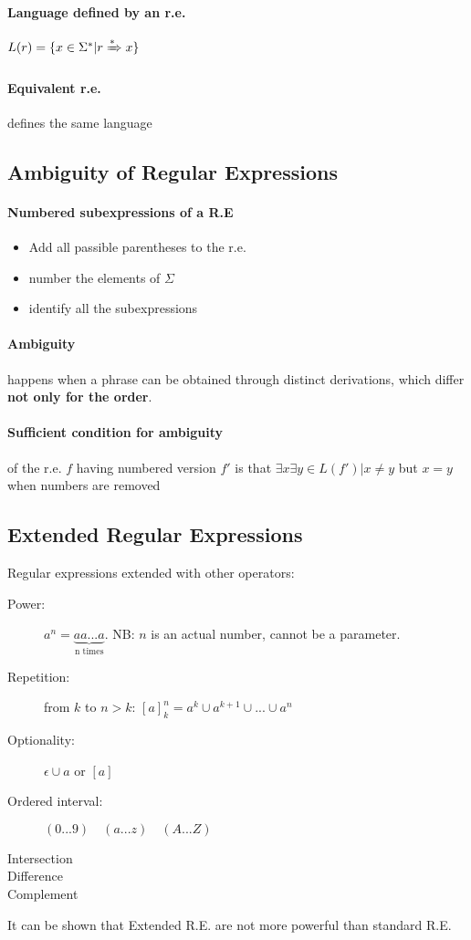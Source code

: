 \documentclass{article}
\begin{document}
\paragraph{Language defined by an r.e.} $L(r)=\{x\in \Sigma^* | r \xRightarrow{*} x\}$
\paragraph{Equivalent r.e.} defines the same language


\subsection{Ambiguity of Regular Expressions}
\paragraph{Numbered subexpressions of a R.E}
\begin{itemize}
\item Add all passible parentheses to the r.e.
\item number the elements of $\Sigma$
\item identify all the subexpressions
\end{itemize}
\paragraph{Ambiguity} happens when a phrase can be obtained through distinct derivations, which differ \textbf{not only for the order}.
\paragraph{Sufficient condition for ambiguity} of the r.e. $f$ having numbered version $f'$ is that $\exists x \exists y \in L(f') | x \neq y$ but  $x=y$ when numbers are removed


\subsection{Extended Regular Expressions}
Regular expressions extended with other operators:
\begin{description}
\item[Power:] $a^n=\underbrace{aa...a}_{\text{n times}}$. NB: $n$ is an actual number, cannot be a parameter.
\item[Repetition:] from $k$ to $n>k$: $[a]_k^n=a^k \cup a^{k+1} \cup ... \cup a^n$
\item[Optionality:] $\epsilon \cup a$ or $[a]$
\item[Ordered interval:] $(0...9) \quad (a...z) \quad (A...Z)$
\item[Intersection]
\item[Difference]
\item[Complement]
\end{description}
It can be shown that Extended R.E. are not more powerful than standard R.E.
\end{document}
